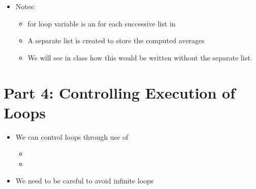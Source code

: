 \documentclass[letterpaper,10pt,english]{sphinxmanual}
\begin{document}
\begin{itemize}
\item {} 
Notes:
\begin{itemize}
\item {} 
for loop variable  is an  for each successive
list in 

\item {} 
A separate list is created to store the computed averages

\item {} 
We will see in class how this would be written without the
separate  list.

\end{itemize}

\end{itemize}


\section{Part 4: Controlling Execution of Loops}
\label{\detokenize{lecture_notes/lec12_loops2_for_double:part-4-controlling-execution-of-loops}}\begin{itemize}
\item {} 
We can control loops through use of
\begin{itemize}
\item {} 

\item {} 

\end{itemize}

\item {} 
We need to be careful to avoid infinite loops

\end{itemize}
\end{document}
